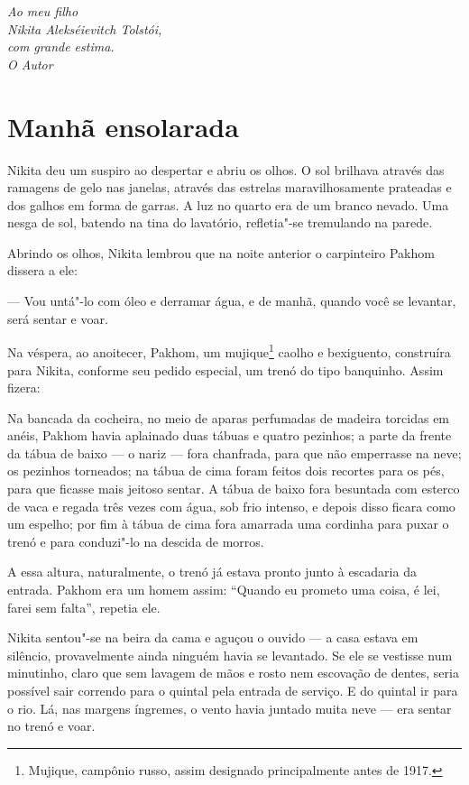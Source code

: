 \mbox{}\vfill\normalsize\thispagestyle{empty}
\noindent{}\textit{Ao meu filho\\[-5pt]
Nikita Alekséievitch Tolstói,\\[-5pt]
com grande estima.\\[-5pt]
O Autor}

\chapter{Manhã ensolarada}\label{texto}

Nikita deu um suspiro ao despertar e abriu os olhos. O sol brilhava
através das ramagens de gelo nas janelas, através das estrelas
maravilhosamente prateadas e dos galhos em forma de garras. A luz no
quarto era de um branco nevado. Uma nesga de sol, batendo na tina do
lavatório, refletia"-se tremulando na parede.

Abrindo os olhos, Nikita lembrou que na noite anterior o carpinteiro
Pakhom dissera a ele:

--- Vou untá"-lo com óleo e derramar água, e de manhã, quando você se
levantar, será sentar e voar.

Na véspera, ao anoitecer, Pakhom, um mujique\footnote{Mujique, campônio russo, assim designado principalmente antes de 1917.} caolho e bexiguento,
construíra para Nikita, conforme seu pedido especial, um trenó do tipo
banquinho. Assim fizera:

Na bancada da cocheira, no meio de aparas perfumadas de madeira torcidas
em anéis, Pakhom havia aplainado duas tábuas e quatro pezinhos; a parte da
frente da tábua de baixo --- o nariz --- fora chanfrada, para que não
emperrasse na neve; os pezinhos torneados; na tábua de cima foram
feitos dois recortes para os pés, para que ficasse mais jeitoso sentar.
A tábua de baixo fora besuntada com esterco de vaca e regada três vezes
com água, sob frio intenso, e depois disso ficara como um espelho; por
fim à tábua de cima fora amarrada uma cordinha para puxar o trenó e para
conduzi"-lo na descida de morros.

A essa altura, naturalmente, o trenó já estava pronto junto à escadaria
da entrada. Pakhom era um homem assim: ``Quando eu prometo uma coisa, é
lei, farei sem falta'', repetia ele.

Nikita sentou"-se na beira da cama e aguçou o ouvido --- a casa estava em
silêncio, provavelmente ainda ninguém havia se levantado. Se ele se
vestisse num minutinho, claro que sem lavagem de mãos e rosto nem
escovação de dentes, seria possível sair correndo para o quintal pela
entrada de serviço. E do quintal ir para o rio. Lá, nas margens
íngremes, o vento havia juntado muita neve --- era sentar no trenó e
voar.

